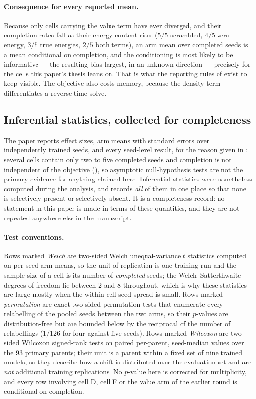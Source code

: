\paragraph{Consequence for every reported mean.} Because only cells carrying the value
term have ever diverged, and their completion rates fall as their energy content rises
($5/5$ scrambled, $4/5$ zero-energy, $3/5$ true energies, $2/5$ both terms), an arm mean
over completed seeds is a mean conditional on completion, and the conditioning is most
likely to be informative --- the resulting bias largest, in an unknown direction ---
precisely for the cells this paper's thesis leans on. That is what the reporting rules
of  exist to keep visible. The objective also costs memory, because
the density term differentiates a reverse-time solve.

\subsection{Inferential statistics, collected for completeness}
\label{app:inferential}

The paper reports effect sizes, arm means with standard errors over independently
trained seeds, and every seed-level result, for the reason given in :
several cells contain only two to five completed seeds and completion is not
independent of the objective (), so asymptotic null-hypothesis
tests are not the primary evidence for anything claimed here. Inferential statistics
were nonetheless computed during the analysis, and  records
\emph{all} of them in one place so that none is selectively present or selectively
absent. It is a completeness record: no statement in this paper is made in terms of
these quantities, and they are not repeated anywhere else in the manuscript.

\paragraph{Test conventions.} Rows marked \emph{Welch} are two-sided Welch
unequal-variance $t$ statistics computed on per-seed arm means, so the unit of
replication is one training run and the sample size of a cell is its number of
\emph{completed} seeds; the Welch--Satterthwaite degrees of freedom lie between $2$ and
$8$ throughout, which is why these statistics are large mostly when the within-cell
seed spread is small. Rows marked \emph{permutation} are exact two-sided permutation
tests that enumerate every relabelling of the pooled seeds between the two arms, so
their $p$-values are distribution-free but are bounded below by the reciprocal of the
number of relabellings ($1/126$ for four against five seeds). Rows marked
\emph{Wilcoxon} are two-sided Wilcoxon signed-rank tests on paired per-parent,
seed-median values over the $93$ primary parents; their unit is a parent within a fixed
set of nine trained models, so they describe how a shift is distributed over the
evaluation set and are \emph{not} additional training replications. No $p$-value here
is corrected for multiplicity, and every row involving cell D, cell F or the value arm
of the earlier round is conditional on completion.

